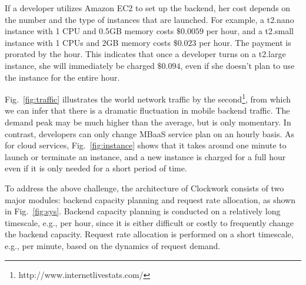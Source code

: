 If a developer utilizes Amazon EC2 to set up the backend, her cost depends on the number and the type of instances that are launched. For example, a t2.nano instance with 1 CPU and 0.5GB memory costs $\$0.0059$ per hour, and a t2.small instance with 1 CPUs and 2GB memory costs $\$0.023$ per hour.  The payment is prorated by the hour. This indicates that once a developer turns on a t2.large instance, she will immediately be charged $\$0.094$, even if she doesn't plan to use the instance for the entire hour. 

Fig.~\ref{fig:traffic} illustrates the world network traffic by the second\footnote{http://www.internetlivestats.com/}, from which we can infer that there is a dramatic fluctuation in mobile backend traffic. The demand peak may be much higher than the average, but is only momentary. In contrast, developers can only change MBaaS service plan on an hourly basis. As for cloud services, Fig.~\ref{fig:instance} shows that it takes around one minute to launch or terminate an instance, and a new instance is charged for a full hour even if it is only needed for a short period of time. 



To address the above challenge, the architecture of Clockwork consists of two major modules: backend capacity planning and request rate allocation, as shown in Fig.~\ref{fig:sys}. Backend capacity planning is conducted on a relatively long timescale, e.g., per hour, since it is either difficult or costly to frequently change the backend capacity. Request rate allocation is performed on a short timescale, e.g., per minute, based on the dynamics of request demand. 

   


 





